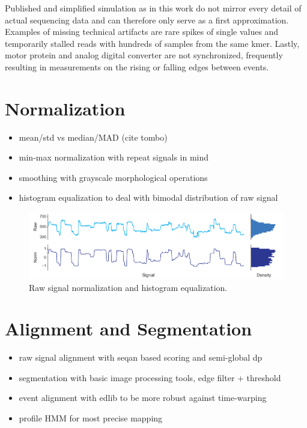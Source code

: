 Published and simplified simulation as in this work do not mirror every detail of actual sequencing data and can therefore only serve as a first approximation. Examples of missing technical artifacts are rare spikes of single values and temporarily stalled reads with hundreds of samples from the same kmer. Lastly, motor protein and analog digital converter are not synchronized, frequently resulting in measurements on the rising or falling edges between events.




\section{Normalization}
\label{sec:signal:normalization}



\begin{itemize}
	\item mean/std vs median/MAD (cite tombo)
	\item min-max normalization with repeat signals in mind
	\item smoothing with grayscale morphological operations
	\item histogram equalization to deal with bimodal distribution of raw signal
\end{itemize}


\begin{figure}[h]
	\centering
	\includegraphics[width=1.0\textwidth]{figures/signal/normalization.pdf}
	\captionsetup{format=plain}
	\caption[Signal normalization and histogram equalization]{Raw signal normalization and histogram equalization.}
	\label{fig:signal:normalization}
\end{figure}




\section{Alignment and Segmentation}
\label{sec:signal:alignment}

\begin{itemize}
	\item raw signal alignment with seqan based scoring and semi-global dp
	\item segmentation with basic image processing tools, edge filter + threshold
	\item event alignment with edlib to be more robust against time-warping
	\item profile HMM for most precise mapping
\end{itemize}

